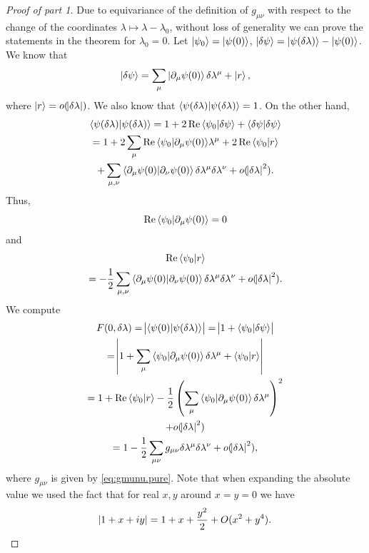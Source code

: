 \documentclass[american,aps,pra,reprint,floatfix,nofootinbib,superscriptaddress]{revtex4-2}
\DeclareMathOperator{\real}{Re}
\begin{document}
\begin{proof}[Proof of part 1]
  Due to equivariance of the definition of $g_{\mu\nu}$ with respect to
  the change of the coordinates $\lambda \mapsto \lambda - \lambda_0$,
  without loss of generality we can prove the statements in the theorem for
  $\lambda_0 = 0$. Let $\ket{\psi_0} = \ket{\psi(0)}$,
  $\ket{\delta \psi} = \ket{\psi(\delta\lambda)} - \ket{\psi(0)}$.
  We know that
  \begin{equation}
    \ket{\delta \psi} = \sum_{\mu} \ket{\partial_\mu\psi(0)} \delta\lambda^\mu
      + \ket{r},
  \end{equation}
  where $\ket{r} = o(\abs{\delta\lambda})$.
  We also know that $\braket{\psi(\delta\lambda)|\psi(\delta\lambda)} = 1$.
  On the other hand,
  \begin{multline}
    \braket{\psi(\delta\lambda)|\psi(\delta\lambda)} =
    1 + 2\real{\braket{\psi_0|\delta\psi}} + \braket{\delta\psi|\delta\psi}\\
    = 1 + 2\sum_\mu\real{\braket{\psi_0|\partial_\mu\psi(0)}}\lambda^\mu
      + 2\real{\braket{\psi_0|r}}\\
      + \sum_{\mu,\nu}\braket{\partial_\mu\psi(0)|\partial_\nu\psi(0)}
        \delta\lambda^\mu \delta\lambda^\nu
      + o(\abs{\delta\lambda}^2).
  \end{multline}
  Thus,
  \begin{equation}
    \real{\braket{\psi_0|\partial_\mu\psi(0)}} = 0
  \end{equation}
  and
  \begin{multline}
    \real{\braket{\psi_0|r}} \\
      = - \frac12 \sum_{\mu,\nu}
        \braket{\partial_\mu\psi(0)|\partial_\nu\psi(0)}
        \delta\lambda^\mu \delta\lambda^\nu
    + o(\abs{\delta\lambda}^2).
  \end{multline}
  We compute
  \begin{multline}
    F(0, \delta\lambda) = \abs{\braket{\psi(0)|\psi(\delta\lambda)}}
    = \abs{1 + \braket{\psi_0|\delta \psi}} \\
    = \abs{1 + \sum_\mu\braket{\psi_0|\partial_\mu \psi(0)}\delta\lambda^\mu
      + \braket{\psi_0|r}} \\
    = 1 + \real{\braket{\psi_0|r}} - \frac12 \left(
      \sum_\mu\braket{\psi_0|\partial_\mu \psi(0)}\delta\lambda^\mu\right)^2\\
      + o(\abs{\delta\lambda}^2) \\
    = 1 - \frac12 \sum_{\mu\nu} g_{\mu\nu} \delta \lambda^\mu \delta \lambda^\nu
      + o(\abs{\delta \lambda}^2),
  \end{multline}
  where $g_{\mu\nu}$ is given by \eqref{eq:gmunu.pure}.
  Note that when expanding the absolute value we used
  the fact that for real $x,y$ around $x=y=0$ we have
  \begin{equation}
    \abs{1 + x + iy} = 1 + x + \frac{y^2}{2} + O(x^2 + y^4).
  \end{equation}
\end{proof}
\end{document}
